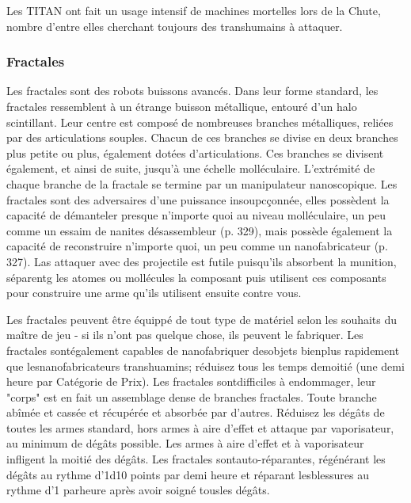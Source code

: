{Les TITAN ont fait un usage intensif de machines mortelles lors de la Chute, nombre d'entre elles cherchant toujours des transhumains à attaquer. 

\subsubsection{Fractales } 

Les fractales sont des robots buissons avancés. Dans leur forme standard, les fractales ressemblent à un étrange buisson métallique, entouré d'un halo scintillant. Leur centre est composé de nombreuses branches métalliques, reliées par des articulations souples. Chacun de ces branches se divise en deux branches plus petite ou plus, également dotées d'articulations. Ces branches se divisent également, et ainsi de suite, jusqu'à une échelle molléculaire. L'extrémité de chaque branche de la fractale se termine par un manipulateur nanoscopique. Les fractales sont des adversaires d'une puissance insoupcçonnée, elles possèdent la capacité de démanteler presque n'importe quoi au niveau molléculaire, un peu comme un essaim de nanites désassembleur (p. 329), mais possède également la capacité de reconstruire n'importe quoi, un peu comme un nanofabricateur (p. 327). Las attaquer avec des projectile est futile puisqu'ils absorbent la munition, séparentg les atomes ou mollécules la composant puis utilisent ces composants pour construire une arme qu'ils utilisent ensuite contre vous. 

Les fractales peuvent être équippé de tout type de matériel selon les souhaits du maître de jeu - si ils n'ont pas quelque chose, ils peuvent le fabriquer. Les fractales sontégalement capables de nanofabriquer desobjets bienplus rapidement que lesnanofabricateurs transhuamins; réduisez tous les temps demoitié (une demi heure par Catégorie de Prix). Les fractales sontdifficiles à endommager, leur "corps" est en fait un assemblage dense de branches fractales. Toute branche abîmée et cassée et récupérée et absorbée par d'autres. Réduisez les dégâts de toutes les armes standard, hors armes à aire d'effet et attaque par vaporisateur, au minimum de dégâts possible. Les armes à aire d'effet et à vaporisateur infligent la moitié des dégâts. Les fractales sontauto-réparantes, régénérant les dégâts au rythme d'1d10 points par demi heure et réparant lesblessures au rythme d'1 parheure après avoir soigné tousles dégâts. \\ \begin{tabular}{|l|l|l|l|l|l|l|l|} \hline


\end{tabular}}
